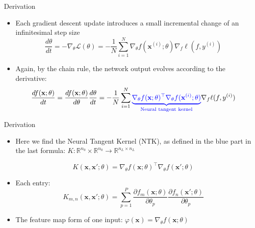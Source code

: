 \documentclass[serif, aspectratio=169]{beamer}
\begin{document}
\begin{frame}{Derivation}
	
	\begin{itemize}
		\item Each gradient descent update introduces a small incremental change of an infinitesimal step size
		\[
		\frac{d\theta}{d t} = - \nabla_\theta\mathcal{L}(\theta)  = -\frac{1}{N} \sum_{i=1}^N \nabla_\theta f(\mathbf{x}^{(i)}; \theta) \nabla_f \ell(f, y^{(i)})
		\] 
		\item Again, by the chain rule, the network output evolves according to the derivative:
		\[
		\frac{df(\mathbf{x};\theta)}{dt} 
		= \frac{df(\mathbf{x};\theta)}{d\theta}\frac{d\theta}{dt}
		= -\frac{1}{N} \sum_{i=1}^N \color{blue}{\underbrace{\nabla_\theta f(\mathbf{x};\theta)^\top \nabla_\theta f(\mathbf{x}^{(i)}; \theta)}_\text{Neural tangent kernel}} \color{black}{\nabla_f \ell(f, y^{(i)})}
		\]
		
	\end{itemize}
\end{frame}



\begin{frame}{Derivation}
	
	\begin{itemize}
		\item Here we find the Neural Tangent Kernel (NTK), as defined in the blue part in the last formula: \(K: \mathbb{R}^{n_0}\times\mathbb{R}^{n_0} \to \mathbb{R}^{n_L \times n_L}\)
		
		\[
		K(\mathbf{x}, \mathbf{x}'; \theta) = \nabla_\theta f(\mathbf{x};\theta)^\top \nabla_\theta f(\mathbf{x}'; \theta)
		\]
		\item Each entry:
		\[
		K_{m,n}(\mathbf{x}, \mathbf{x}'; \theta) = \sum_{p=1}^P \frac{\partial f_m(\mathbf{x};\theta)}{\partial \theta_p} \frac{\partial f_n(\mathbf{x}';\theta)}{\partial \theta_p}
		\]
		\item The feature map form of one input: \(\varphi(\mathbf{x}) = \nabla_\theta f(\mathbf{x};\theta)\)
	\end{itemize}
\end{frame}
\end{document}
